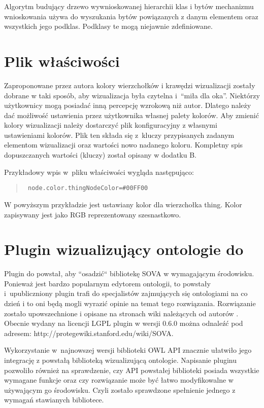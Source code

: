 

\par 
Algorytm budujący drzewo wywnioskowanej hierarchii klas i bytów mechanizmu wnioskowania używa do wyszukania bytów powiązanych z danym elementem oraz wszystkich 
jego podklas. Podklasy te mogą niejawnie zdefiniowane. 

\section {Plik właściwości}

Zaproponowane przez autora kolory wierzchołków i krawędzi wizualizacji zostały dobrane w taki sposób, aby wizualizacja była czytelna i~``miła dla oka''.
Niektórzy użytkownicy mogą posiadać inną percepcję wzrokową niż autor. Dlatego należy dać możliwość ustawienia przez użytkownika własnej palety
 kolorów. Aby zmienić kolory wizualizacji należy dostarczyć plik konfiguracyjny z własnymi ustawieniami kolorów. Plik ten składa się z~kluczy przypisanych 
zadanym elementom wizualizacji oraz wartości nowo nadanego koloru. Kompletny spis dopuszczanych wartości (kluczy) został opisany w dodatku B. 
\par Przykładowy wpis w~pliku właściwości wygląda następująco:
\begin{quote}
  \verb+ node.color.thingNodeColor=#00FF00+
\end{quote}
W powyższym przykładzie jest ustawiany kolor dla wierzchołka thing. Kolor zapisywany jest jako RGB reprezentowany szesnastkowo. 

\section{Plugin wizualizujący ontologie do \protege}
Plugin do \proteges powstał, aby ``osadzić`` bibliotekę SOVA w wymagającym środowisku. Ponieważ \proteges jest bardzo popularnym edytorem ontologii, to powstały 
i~upubliczniony plugin trafi do specjalistów zajmujących się ontologiami na co dzień i to oni będą mogli wyrazić opinie na temat tego rozwiązania. Rozwiązanie zostało
upowszechnione i opisane na stronach wiki należących od autorów \protege. Obecnie wydany na licencji LGPL plugin w wersji 0.6.0 można odnaleźć pod adresem:
 http://protegewiki.stanford.edu/wiki/SOVA.

 
\par Wykorzystanie w~najnowszej wersji \proteges biblioteki OWL API znacznie ułatwiło jego integrację z powstałą biblioteką wizualizującą ontologie. Napisanie
  pluginu pozwoliło również na sprawdzenie, czy API powstałej biblioteki posiada wszystkie wymagane funkcje oraz czy rozwiązanie może być łatwo modyfikowalne
 w używającym go środowisku.  Czyli zostało sprawdzone spełnienie jednego z wymagań stawianych bibliotece. 

